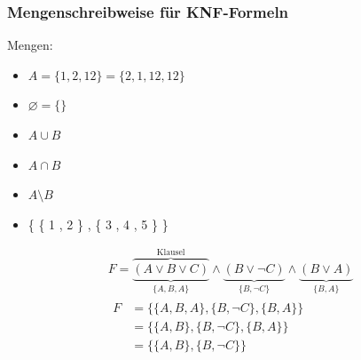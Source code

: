 \subsubsection{Mengenschreibweise für KNF-Formeln}
Mengen:
\begin{itemize}
	\item $A = \{ 1 , 2 , 12 \} = \{ 2 , 1 , 12 , 12 \}$
	\item $\varnothing = \{\}$
	\item $A \cup B$
	\item $A \cap B$
	\item $A \setminus B$
	\item \{ \{ 1 , 2 \} , \{ 3 , 4 , 5 \} \}
\end{itemize}
\begin{bsp*}
	\begin{gather*}
		F = \underbrace{\overbrace{( A \vee B \vee C )}^{\text{Klausel}}}_{\{ A , B , A \}} \wedge \underbrace{( B \vee \neg C )}_{\{ B , \neg C \}} \wedge \underbrace{( B \vee A )}_{\{B , A\}} \\
		\begin{aligned}
		F 	&= \{ \{ A , B , A \} , \{ B , ¬ C \} , \{ B , A \} \} \\
			&= \{ \{ A , B \} , \{ B , ¬ C \} , \{ B , A \} \} \\
			&= \{ \{ A , B \} , \{ B , ¬ C \} \}
		\end{aligned}
	\end{gather*}
\end{bsp*}
